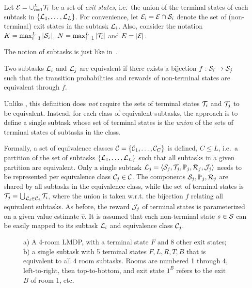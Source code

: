 Let $\mathcal{E}=\cup_{i=1}^L\mathcal{T}_i$ be a set of {\em exit states}, i.e.~the union of the terminal states of each subtask in $\{\mathcal{L}_1,\ldots,\mathcal{L}_L\}$. For convenience, let $\mathcal{E}_i=\mathcal{E}\cap\mathcal{S}_i$ denote the set of (non-terminal) exit states in the subtask $\mathcal{L}_i$. Also, consider the notation $K=\max_{i=1}^L|\mathcal{S}_i|$, $N=\max_{i=1}^L|\mathcal{T}_i|$ and $E=|\mathcal{E}|$.

The notion of subtasks is just like in~\citep{Wen2020}.
\begin{definition}
Two subtasks $\mathcal{L}_i$ and $\mathcal{L}_j$ are equivalent if there exists a bijection $f:\mathcal{S}_i\rightarrow\mathcal{S}_j$ such that the transition probabilities and rewards of non-terminal states are equivalent through $f$.
\end{definition}
Unlike \citep{Wen2020}, this definition does {\em not} require the sets of terminal states $\mathcal{T}_i$ and $\mathcal{T}_j$ to be equivalent. Instead, for each class of equivalent subtasks, the approach is to define a single subtask whose set of terminal states is the {\em union} of the sets of terminal states of subtasks in the class.

Formally, a set of equivalence classes $\mathcal{C}=\{\mathcal{C}_1,\ldots,\mathcal{C}_C\}$ is defined, $C\leq L$, i.e.~a partition of the set of subtasks $\{\mathcal{L}_1,\ldots,\mathcal{L}_L\}$ such that all subtasks in a given partition are equivalent. Only a single subtask $\mathcal{L}_j=\langle\mathcal{S}_j,\mathcal{T}_j,\mathbb{P}_j,\mathcal{R}_j,\mathcal{J}_j\rangle$ needs to be represented per equivalence class $\mathcal{C}_j\in\mathcal{C}$. The components $\mathcal{S}_j,\mathbb{P}_j,\mathcal{R}_j$ are shared by all subtasks in the equivalence class, while the set of terminal states is $\mathcal{T}_j=\bigcup_{\mathcal{L}_i\in\mathcal{C}_j} \mathcal{T}_i$, where the union is taken w.r.t. the bijection $f$ relating all equivalent subtasks. As before, the reward $\mathcal{J}_j$ of terminal states is parameterized on a given value estimate $\widehat{v}$. It is assumed that each non-terminal state $s\in\mathcal{S}$ can be easily mapped to its subtask $\mathcal{L}_i$ and equivalence class $\mathcal{C}_j$.


\begin{figure}[!t]
\begin{center}
    
\end{center}
\caption{a) A 4-room LMDP, with a terminal state $F$ and 8 other exit states; b) a single subtask with 5 terminal states $F,L,R,T,B$ that is equivalent to all 4 room subtasks. Rooms are numbered 1 through 4, left-to-right, then top-to-bottom, and exit state $1^B$ refers to the exit $B$ of room $1$, etc.}
\label{fig:ex}
\end{figure}


